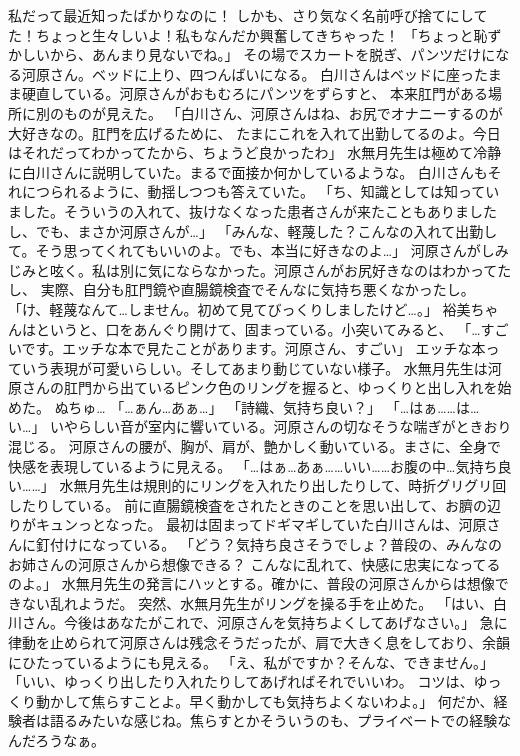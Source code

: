 私だって最近知ったばかりなのに！
しかも、さり気なく名前呼び捨てにしてた！ちょっと生々しいよ！私もなんだか興奮してきちゃった！
「ちょっと恥ずかしいから、あんまり見ないでね。」
その場でスカートを脱ぎ、パンツだけになる河原さん。ベッドに上り、四つんばいになる。
白川さんはベッドに座ったまま硬直している。河原さんがおもむろにパンツをずらすと、
本来肛門がある場所に別のものが見えた。
「白川さん、河原さんはね、お尻でオナニーするのが大好きなの。肛門を広げるために、
たまにこれを入れて出勤してるのよ。今日はそれだってわかってたから、ちょうど良かったわ」
水無月先生は極めて冷静に白川さんに説明していた。まるで面接か何かしているような。
白川さんもそれにつられるように、動揺しつつも答えていた。
「ち、知識としては知っていました。そういうの入れて、抜けなくなった患者さんが来たこともありましたし、でも、まさか河原さんが…」
「みんな、軽蔑した？こんなの入れて出勤して。そう思ってくれてもいいのよ。でも、本当に好きなのよ…」
河原さんがしみじみと呟く。私は別に気にならなかった。河原さんがお尻好きなのはわかってたし、
実際、自分も肛門鏡や直腸鏡検査でそんなに気持ち悪くなかったし。
「け、軽蔑なんて…しません。初めて見てびっくりしましたけど…。」
裕美ちゃんはというと、口をあんぐり開けて、固まっている。小突いてみると、
「…すごいです。エッチな本で見たことがあります。河原さん、すごい」
エッチな本っていう表現が可愛いらしい。そしてあまり動じていない様子。
水無月先生は河原さんの肛門から出ているピンク色のリングを握ると、ゆっくりと出し入れを始めた。
ぬちゅ…
「…ぁん…あぁ…」
「詩織、気持ち良い？」
「…はぁ……は…い…」
いやらしい音が室内に響いている。河原さんの切なそうな喘ぎがときおり混じる。
河原さんの腰が、胸が、肩が、艶かしく動いている。まさに、全身で快感を表現しているように見える。
「…はぁ…あぁ……いい……お腹の中…気持ち良い……」
水無月先生は規則的にリングを入れたり出したりして、時折グリグリ回したりしている。
前に直腸鏡検査をされたときのことを思い出して、お臍の辺りがキュンっとなった。
最初は固まってドギマギしていた白川さんは、河原さんに釘付けになっている。
「どう？気持ち良さそうでしょ？普段の、みんなのお姉さんの河原さんから想像できる？
こんなに乱れて、快感に忠実になってるのよ。」
水無月先生の発言にハッとする。確かに、普段の河原さんからは想像できない乱れようだ。
突然、水無月先生がリングを操る手を止めた。
「はい、白川さん。今後はあなたがこれで、河原さんを気持ちよくしてあげなさい。」
急に律動を止められて河原さんは残念そうだったが、肩で大きく息をしており、余韻にひたっているようにも見える。
「え、私がですか？そんな、できません。」
「いい、ゆっくり出したり入れたりしてあげればそれでいいわ。
コツは、ゆっくり動かして焦らすことよ。早く動かしても気持ちよくないわよ。」
何だか、経験者は語るみたいな感じね。焦らすとかそういうのも、プライベートでの経験なんだろうなぁ。
